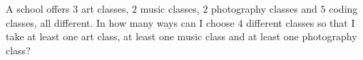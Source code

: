 A school offers $3$ art classes, $2$ music classes, $2$ photography classes and $5$ coding classes, all different. In how many ways can I choose $4$ different classes so that I take at least one art class, at least one music class and at least one photography class?
